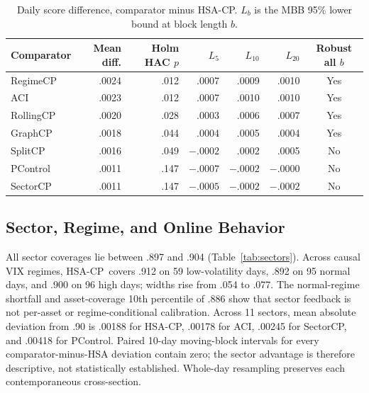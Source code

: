 \documentclass[conference]{IEEEtran}
\newcommand{\method}{HSA-CP}
\begin{document}
\begin{table}[t]
\centering
\caption{Daily score difference, comparator minus \method. $L_b$ is the MBB 95\% lower bound at block length $b$.}
\label{tab:stats}
\small
\setlength{\tabcolsep}{7.5pt}
\begin{tabular}{lrrrrrc}
\toprule
Comparator & Mean diff. & Holm HAC $p$ & $L_5$ & $L_{10}$ & $L_{20}$ & Robust all $b$\\
\midrule
RegimeCP  & .0024 & .012 & .0007 & .0009 & .0010 & Yes\\
ACI       & .0023 & .012 & .0007 & .0010 & .0010 & Yes\\
RollingCP & .0020 & .028 & .0003 & .0006 & .0007 & Yes\\
GraphCP   & .0018 & .044 & .0004 & .0005 & .0004 & Yes\\
SplitCP   & .0016 & .049 & $-.0002$ & .0002 & .0005 & No\\
PControl  & .0011 & .147 & $-.0007$ & $-.0002$ & $-.0000$ & No\\
SectorCP  & .0011 & .147 & $-.0005$ & $-.0002$ & $-.0002$ & No\\
\bottomrule
\end{tabular}
\end{table}

\subsection{Sector, Regime, and Online Behavior}

All sector coverages lie between .897 and .904 (Table~\ref{tab:sectors}). Across causal VIX regimes, \method\ covers .912 on 59 low-volatility days, .892 on 95 normal days, and .900 on 96 high days; widths rise from .054 to .077. The normal-regime shortfall and asset-coverage 10th percentile of .886 show that sector feedback is not per-asset or regime-conditional calibration. Across 11 sectors, mean absolute deviation from .90 is .00188 for \method, .00178 for ACI, .00245 for SectorCP, and .00418 for PControl. Paired 10-day moving-block intervals for every comparator-minus-HSA deviation contain zero; the sector advantage is therefore descriptive, not statistically established. Whole-day resampling preserves each contemporaneous cross-section.
\end{document}
